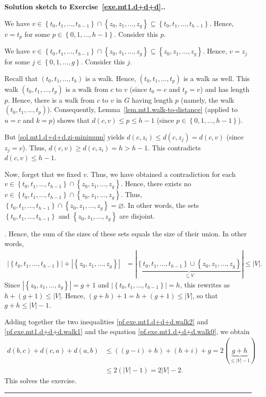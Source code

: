 \documentclass[numbers=enddot,12pt,final,onecolumn,notitlepage]{scrartcl}%
\newcounter{exer}
\theoremstyle{definition}
\newenvironment{proof}[1][Proof]{\noindent\textbf{#1.} }{\ \rule{0.5em}{0.5em}}
\newcommand{\set}[1]{\left\{ #1 \right\}}
\newcommand{\abs}[1]{\left| #1 \right|}
\newcommand{\tup}[1]{\left( #1 \right)}
\begin{document}
\begin{proof}[Solution sketch to Exercise~\ref{exe.mt1.d+d+d}.]
{We have
$v \in
\set{t_0, t_1, \ldots, t_{h-1}} \cap \set{z_0, z_1, \ldots, z_g}
\subseteq \set{t_0, t_1, \ldots, t_{h-1}}$. Hence,
$v = t_p$ for some $p \in \set{0, 1, \ldots, h-1}$. Consider this
$p$.

We have $v \in
\set{t_0, t_1, \ldots, t_{h-1}} \cap \set{z_0, z_1, \ldots, z_g}
\subseteq \set{z_0, z_1, \ldots, z_g}$. Hence,
$v = z_j$ for some $j \in \set{0, 1, \ldots, g}$. Consider this
$j$. 

Recall that $\tup{t_0, t_1, \ldots, t_h}$ is a walk. Hence,
$\tup{t_0, t_1, \ldots, t_p}$ is a walk as well. This walk
$\tup{t_0, t_1, \ldots, t_p}$ is a walk from $c$ to $v$ (since
$t_0 = c$ and $t_p = v$) and has length $p$.
Hence, there is a walk from $c$ to $v$ in $G$ having length
$p$ (namely, the walk $\tup{t_0, t_1, \ldots, t_p}$).
Consequently, Lemma~\ref{lem.mt1.walk-to-distance}
(applied to $u = c$ and $k = p$) shows that
$d \tup{c, v} \leq p \leq h-1$
(since $p \in \set{0, 1, \ldots, h-1}$).

But \eqref{sol.mt1.d+d+d.zi-minimum} yields
$d \tup{c, z_i} \leq d \tup{c, z_j} = d \tup{c, v}$
(since $z_j = v$). Thus, $d \tup{c, v} \geq d \tup{c, z_i}
= h > h-1$. This contradicts $d \tup{c, v} \leq h-1$.

Now, forget that we fixed $v$. Thus, we have obtained a
contradiction for each
$v \in
\set{t_0, t_1, \ldots, t_{h-1}} \cap \set{z_0, z_1, \ldots, z_g}$.
Hence, there exists no
$v \in
\set{t_0, t_1, \ldots, t_{h-1}} \cap \set{z_0, z_1, \ldots, z_g}$.
Thus,
$\set{t_0, t_1, \ldots, t_{h-1}} \cap \set{z_0, z_1, \ldots, z_g}
= \varnothing$. In other words, the sets
$\set{t_0, t_1, \ldots, t_{h-1}}$ and
$\set{z_0, z_1, \ldots, z_g}$ are disjoint.}. Hence, the sum of
the sizes of these sets equals the size of their union. In other
words,
\begin{align*}
\abs{\set{t_0, t_1, \ldots, t_{h-1}}}
+ \abs{\set{z_0, z_1, \ldots, z_g}}
&=
\abs{\underbrace{\set{t_0, t_1, \ldots, t_{h-1}} \cup
                   \set{z_0, z_1, \ldots, z_g}}_{\subseteq V}}
\leq \abs{V} .
\end{align*}
Since $\abs{\set{z_0, z_1, \ldots, z_g}} = g+1$
and $\abs{\set{t_0, t_1, \ldots, t_{h-1}}} = h$, this rewrites as
$h + \tup{g+1} \leq \abs{V}$. Hence,
$\tup{g+h} + 1 = h + \tup{g+1} \leq \abs{V}$, so that
$g+h \leq \abs{V} - 1$.

Adding together the two inequalities \eqref{pf.exe.mt1.d+d+d.walk2}
and \eqref{pf.exe.mt1.d+d+d.walk1} and the equation
\eqref{pf.exe.mt1.d+d+d.walk0}, we obtain
\begin{align*}
d \tup{b, c} + d \tup{c, a} + d \tup{a, b}
&\leq \tup{\tup{g-i} + h} + \tup{h + i} + g
= 2 \tup{\underbrace{g+h}_{\leq \abs{V} - 1}} \\
&\leq 2 \tup{\abs{V} - 1} = 2 \abs{V} - 2 .
\end{align*}
This solves the exercise.
\end{proof}
\end{document}
